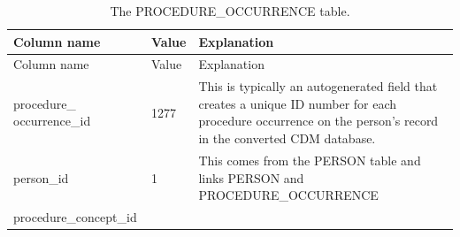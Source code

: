 \documentclass[11pt]{book}
\theoremstyle{definition}
\theoremstyle{definition}
\theoremstyle{definition}
\theoremstyle{remark}
\begin{document}
\begin{longtable}[]{@{}lll@{}}
\caption{\label{tab:procedureOccurrence} The PROCEDURE\_OCCURRENCE table.}\tabularnewline
\toprule
\begin{minipage}[b]{0.28\columnwidth}\raggedright
Column name\strut
\end{minipage} & \begin{minipage}[b]{0.15\columnwidth}\raggedright
Value\strut
\end{minipage} & \begin{minipage}[b]{0.49\columnwidth}\raggedright
Explanation\strut
\end{minipage}\tabularnewline
\midrule
\endfirsthead
\toprule
\begin{minipage}[b]{0.28\columnwidth}\raggedright
Column name\strut
\end{minipage} & \begin{minipage}[b]{0.15\columnwidth}\raggedright
Value\strut
\end{minipage} & \begin{minipage}[b]{0.49\columnwidth}\raggedright
Explanation\strut
\end{minipage}\tabularnewline
\midrule
\endhead
\begin{minipage}[t]{0.28\columnwidth}\raggedright
procedure\_ occurrence\_id\strut
\end{minipage} & \begin{minipage}[t]{0.15\columnwidth}\raggedright
1277\strut
\end{minipage} & \begin{minipage}[t]{0.49\columnwidth}\raggedright
This is typically an autogenerated field that creates a unique ID number for each procedure occurrence on the person's record in the converted CDM database.\strut
\end{minipage}\tabularnewline
\begin{minipage}[t]{0.28\columnwidth}\raggedright
person\_id\strut
\end{minipage} & \begin{minipage}[t]{0.15\columnwidth}\raggedright
1\strut
\end{minipage} & \begin{minipage}[t]{0.49\columnwidth}\raggedright
This comes from the PERSON table and links PERSON and PROCEDURE\_OCCURRENCE\strut
\end{minipage}\tabularnewline
\begin{minipage}[t]{0.28\columnwidth}\raggedright
procedure\_concept\_id\strut
\end{minipage} & \begin{minipage}[t]{0.15\columnwidth}\raggedright

\end{minipage}
\end{longtable}
\end{document}
